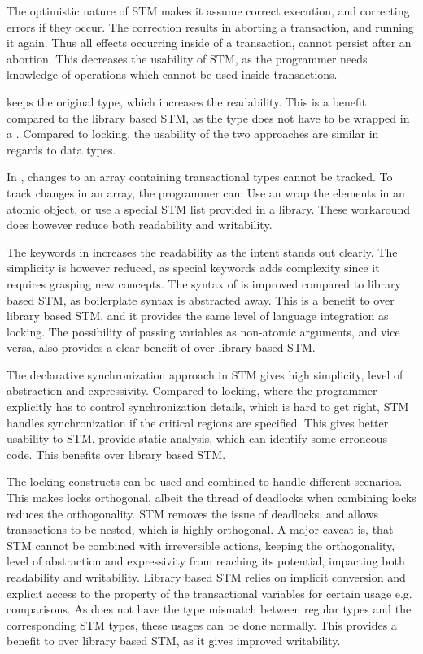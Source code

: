 The optimistic nature of \ac{STM} makes it assume correct execution, and correcting errors if they occur. The correction results in aborting a transaction, and running it again. Thus all effects occurring inside of a transaction, cannot persist after an abortion. This decreases the usability of \ac{STM}, as the programmer needs knowledge of operations which cannot be used inside transactions.

\stmname keeps the original type, which increases the readability. This is a benefit compared to the library based \ac{STM}, as the type does not have to be wrapped in a . Compared to locking, the usability of the two approaches are similar in regards to data types. 

In \stmname, changes to an array containing transactional types cannot be tracked. To track changes in an array, the programmer can: Use an  wrap the elements in an atomic object, or use a special \ac{STM} list provided in a library. These workaround does however reduce both readability and writability. 

The keywords in \stmname increases the readability as the intent stands out clearly. The simplicity is however reduced, as special keywords adds complexity since it requires grasping new concepts. The syntax of \stmname is improved compared to library based \ac{STM}, as boilerplate syntax is abstracted away. This is a benefit to \stmname over library based \ac{STM}, and it provides the same level of language integration as locking. The possibility of passing  variables as non-atomic arguments, and vice versa, also provides a clear benefit of \stmname over library based \ac{STM}. 

The declarative synchronization approach in \ac{STM} gives high simplicity, level of abstraction and expressivity. Compared to locking, where the programmer explicitly has to control synchronization details, which is hard to get right, \ac{STM} handles synchronization if the critical regions are specified. This gives better usability to \ac{STM}. \stmname provide static analysis, which can identify some erroneous code. This benefits \stmname over library based \ac{STM}.

The locking constructs can be used and combined to handle different scenarios. This makes locks orthogonal, albeit the thread of deadlocks when combining locks reduces the orthogonality. \ac{STM} removes the issue of deadlocks, and allows transactions to be nested, which is highly orthogonal. A major caveat is, that \ac{STM} cannot be combined with irreversible actions, keeping the orthogonality, level of abstraction and expressivity from reaching its potential, impacting both readability and writability. Library based \ac{STM} relies on implicit conversion and explicit access to the  property of the transactional variables for certain usage e.g. comparisons. As \stmname does not have the type mismatch between regular types and the corresponding \ac{STM} types, these usages can be done normally. This provides a benefit to \stmname over library based \ac{STM}, as it gives improved writability.


